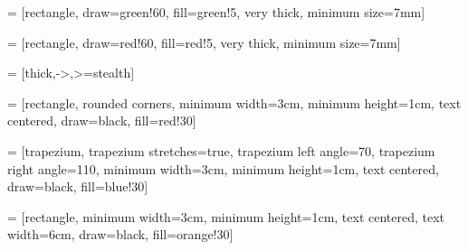 \usepackage{tikz}
\usetikzlibrary{positioning, tikzmark, calc, shapes.geometric, arrows}  %

\newenvironment{myTree}
{
    \begingroup
    \begin{center}
    \begin{tikzpicture}[level distance=1.5cm, level 1/.style={sibling distance=3cm}, level 2/.style={sibling distance=1.5cm}]
}
{
    \end{tikzpicture}
    \end{center}
    \endgroup
}


\newenvironment{myTreeLThree}
{
    \begingroup
    \begin{center}
    \begin{tikzpicture}[level distance=1.5cm, level 1/.style={sibling distance=6cm}, level 2/.style={sibling distance=3cm}, level 3/.style={sibling distance=1.5cm}]
}
{
    \end{tikzpicture}
    \end{center}
    \endgroup
}

\newenvironment{vArrow}[3][black]
{
    \draw[->, #1] (#2) -- (#3);
}
{

}

\newenvironment{tArcDown}[2][black]
{
    \draw[-latex,#1] ($#2$) arc [ start angle=-160, end angle=-20, x radius=0.9cm, y radius =0.7cm ] ;
}
{

}


\newenvironment{tArcUp}[2][red]
{
    \draw[-latex,#1] ($#2$) arc [ start angle=160, end angle=20, x radius=0.9cm, y radius =0.7cm ] ;
}
{

}

 = [rectangle, draw=green!60, fill=green!5, very thick, minimum size=7mm]

 = [rectangle, draw=red!60, fill=red!5, very thick, minimum size=7mm]

 = [thick,->,>=stealth]

 = [rectangle, rounded corners, minimum width=3cm, minimum height=1cm, text centered, draw=black, fill=red!30]

 = [trapezium, trapezium stretches=true, trapezium left angle=70, trapezium right angle=110, minimum width=3cm, minimum height=1cm, text centered, draw=black, fill=blue!30]

 = [rectangle, minimum width=3cm, minimum height=1cm, text centered, text width=6cm, draw=black, fill=orange!30]

